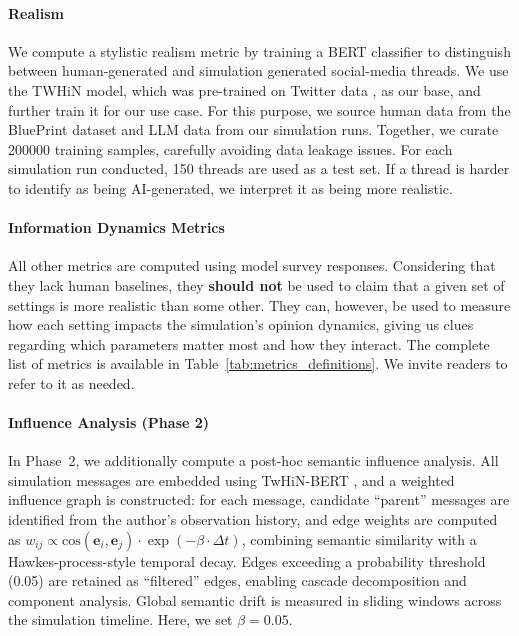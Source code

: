 \documentclass[11pt]{article}
\begin{document}
\paragraph{Realism} We compute a stylistic realism metric by training a BERT classifier to distinguish between human-generated and simulation generated social-media threads. We use the TWHiN model, which was pre-trained on Twitter data \cite{zhang2023twhinbertsociallyenrichedpretrainedlanguage}, as our base, and further train it for our use case. For this purpose, we source human data from the BluePrint dataset and LLM data from our simulation runs. Together, we curate 200000 training samples, carefully avoiding data leakage issues. For each simulation run conducted, 150 threads are used as a test set. If a thread is harder to identify as being AI-generated, we interpret it as being more realistic.

\paragraph{Information Dynamics Metrics} All other metrics are computed using model survey responses. Considering that they lack human baselines, they \textbf{should not} be used to claim that a given set of settings is more realistic than some other. They can, however, be used to measure how each setting impacts the simulation's opinion dynamics, giving us clues regarding which parameters matter most and how they interact. The complete list of metrics is available in Table~\ref{tab:metrics_definitions}. We invite readers to refer to it as needed.

\paragraph{Influence Analysis (Phase 2)} In Phase~2, we additionally compute a post-hoc semantic influence analysis. All simulation messages are embedded using TwHiN-BERT \cite{zhang2023twhinbertsociallyenrichedpretrainedlanguage}, and a weighted influence graph is constructed: for each message, candidate ``parent'' messages are identified from the author's observation history, and edge weights are computed as $w_{ij} \propto \text{cos}(\mathbf{e}_i, \mathbf{e}_j) \cdot \exp(-\beta \cdot \Delta t)$, combining semantic similarity with a Hawkes-process-style temporal decay. Edges exceeding a probability threshold (0.05) are retained as ``filtered'' edges, enabling cascade decomposition and component analysis. Global semantic drift is measured in sliding windows across the simulation timeline. Here, we set $\beta=0.05$.
\end{document}
